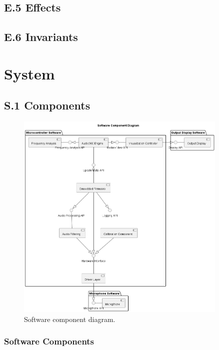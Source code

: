 \documentclass[12pt]{article}
\theoremstyle{definition}
\begin{document}
\subsection{E.5 Effects}

\subsection{E.6 Invariants}

\section{System}

\subsection{S.1 Components}

\begin{figure}[H]     
    \centering 
    \includegraphics[width=0.9\textwidth]{diagrams/s1_component_diagram.png}
    \caption{Software component diagram.}
    \label{fig:software_component_diagram}
\end{figure}

\subsubsection{Software Components}
\end{document}
